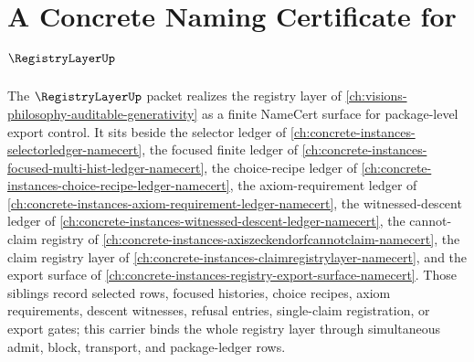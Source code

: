 \chapter{A Concrete Naming Certificate for $\RegistryLayerUp$}
\label{ch:concrete-instances-registrylayer-namecert}

The $\RegistryLayerUp$ packet realizes the registry layer of \autoref{ch:visions-philosophy-auditable-generativity} as a finite NameCert surface for package-level export control. It sits beside the selector ledger of \autoref{ch:concrete-instances-selectorledger-namecert}, the focused finite ledger of \autoref{ch:concrete-instances-focused-multi-hist-ledger-namecert}, the choice-recipe ledger of \autoref{ch:concrete-instances-choice-recipe-ledger-namecert}, the axiom-requirement ledger of \autoref{ch:concrete-instances-axiom-requirement-ledger-namecert}, the witnessed-descent ledger of \autoref{ch:concrete-instances-witnessed-descent-ledger-namecert}, the cannot-claim registry of \autoref{ch:concrete-instances-axiszeckendorfcannotclaim-namecert}, the claim registry layer of \autoref{ch:concrete-instances-claimregistrylayer-namecert}, and the export surface of \autoref{ch:concrete-instances-registry-export-surface-namecert}. Those siblings record selected rows, focused histories, choice recipes, axiom requirements, descent witnesses, refusal entries, single-claim registration, or export gates; this carrier binds the whole registry layer through simultaneous admit, block, transport, and package-ledger rows.

